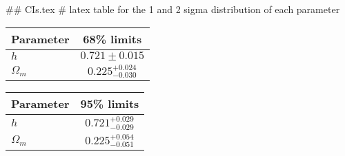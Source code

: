 ## CIs.tex
# latex table for the 1 and 2 sigma distribution of each parameter

\begin{tabular} { l  c}
 Parameter &  68\% limits\\
\hline
{\boldmath$h              $} & $0.721\pm 0.015            $\\
{\boldmath$\Omega_m       $} & $0.225^{+0.024}_{-0.030}   $\\
\hline
\end{tabular}

\begin{tabular} { l  c}
 Parameter &  95\% limits\\
\hline
{\boldmath$h              $} & $0.721^{+0.029}_{-0.029}   $\\
{\boldmath$\Omega_m       $} & $0.225^{+0.054}_{-0.051}   $\\
\hline
\end{tabular}
